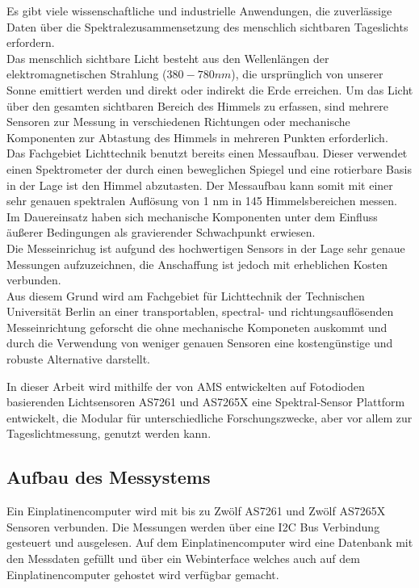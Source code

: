 Es gibt viele wissenschaftliche und industrielle Anwendungen, die zuverlässige Daten über die Spektralezusammensetzung des menschlich sichtbaren Tageslichts erfordern.\\
Das menschlich sichtbare Licht besteht aus den Wellenlängen der elektromagnetischen Strahlung ($380 - 780 nm$), die ursprünglich von unserer Sonne emittiert werden und direkt oder indirekt die Erde erreichen.
Um das Licht über den gesamten sichtbaren Bereich des Himmels zu erfassen, sind mehrere Sensoren zur Messung in verschiedenen Richtungen oder mechanische Komponenten zur Abtastung des Himmels in mehreren Punkten erforderlich.\\
Das Fachgebiet Lichttechnik benutzt bereits einen Messaufbau. Dieser verwendet einen Spektrometer der durch einen beweglichen Spiegel und eine rotierbare Basis in der Lage ist den Himmel abzutasten. 
Der Messaufbau kann somit mit einer sehr genauen spektralen Auflösung von 1 nm in 145 Himmelsbereichen messen.\\
Im Dauereinsatz haben sich mechanische Komponenten unter dem Einfluss äußerer Bedingungen als gravierender Schwachpunkt erwiesen.\\
 Die Messeinrichug ist aufgund des hochwertigen Sensors in der Lage sehr genaue Messungen aufzuzeichnen, die Anschaffung ist jedoch mit erheblichen Kosten verbunden.\\
Aus diesem Grund wird am Fachgebiet für Lichttechnik der Technischen Universität Berlin an einer transportablen, spectral- und richtungsauflösenden Messeinrichtung geforscht die ohne mechanische Komponeten auskommt und durch die Verwendung von weniger genauen Sensoren eine kostengünstige und robuste Alternative darstellt.

\noindent In dieser Arbeit wird mithilfe der von AMS entwickelten auf Fotodioden basierenden Lichtsensoren  AS7261 und AS7265X eine Spektral-Sensor Plattform entwickelt, die Modular für unterschiedliche Forschungszwecke, aber vor allem zur Tageslichtmessung, genutzt werden kann.


\subsection{Aufbau des Messystems}
Ein Einplatinencomputer wird mit bis zu Zwölf AS7261 und Zwölf AS7265X Sensoren verbunden.
Die Messungen werden über eine I2C Bus Verbindung gesteuert und ausgelesen.
Auf dem Einplatinencomputer  wird eine Datenbank mit den Messdaten gefüllt und über ein Webinterface welches auch auf dem Einplatinencomputer gehostet wird verfügbar gemacht.
